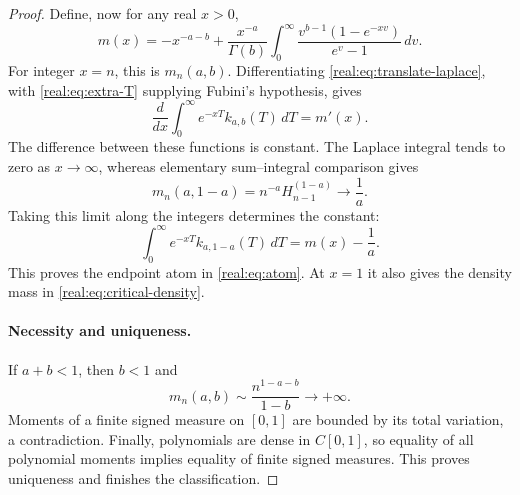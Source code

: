 \begin{proof}
Define, now for any real $x>0$,
\begin{equation}\label{real:eq:interpolated-moment}
 m(x)=-x^{-a-b}+\frac{x^{-a}}{\Gamma(b)}
  \int_0^\infty\frac{v^{b-1}(1-e^{-xv})}{e^v-1}\,dv.
\end{equation}
For integer $x=n$, this is $m_n(a,b)$. Differentiating
\eqref{real:eq:translate-laplace}, with
\eqref{real:eq:extra-T} supplying Fubini's hypothesis, gives
\[
 \frac{d}{dx}\int_0^\infty e^{-xT}k_{a,b}(T)\,dT=m'(x).
\]
The difference between these functions is constant. The Laplace
integral tends to zero as $x\to\infty$, whereas elementary
sum--integral comparison gives
\[
 m_n(a,1-a)=n^{-a}H_{n-1}^{(1-a)}\longrightarrow\frac1a.
\]
Taking this limit along the integers determines the constant:
\begin{equation}\label{real:eq:critical-laplace}
 \int_0^\infty e^{-xT}k_{a,1-a}(T)\,dT=m(x)-\frac1a.
\end{equation}
This proves the endpoint atom in \eqref{real:eq:atom}. At $x=1$
it also gives the density mass in \eqref{real:eq:critical-density}.

\paragraph{Necessity and uniqueness.}
If $a+b<1$, then $b<1$ and
\[
 m_n(a,b)\sim\frac{n^{1-a-b}}{1-b}\longrightarrow+\infty.
\]
Moments of a finite signed measure on $[0,1]$ are bounded by its
total variation, a contradiction. Finally, polynomials are dense in
$C[0,1]$, so equality of all polynomial moments implies equality of
finite signed measures. This proves uniqueness and finishes the
classification.
\end{proof}

